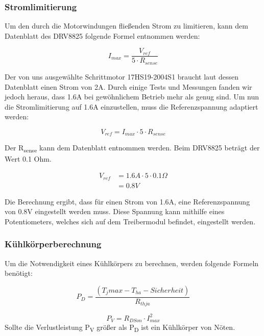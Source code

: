 \subsubsection{Stromlimitierung}
Um den durch die Motorwindungen fließenden Strom zu limitieren, kann dem Datenblatt des DRV8825 folgende Formel entnommen werden:

\begin{equation}
    I_{max} = \frac{V_{ref}} {5 \cdot R_{sense}}
\end{equation}

Der von uns ausgewählte Schrittmotor 17HS19-2004S1 braucht laut dessen Datenblatt einen Strom von 2A.
Durch einige Tests und Messungen fanden wir jedoch heraus, dass 1.6A bei gewöhnlichem Betrieb mehr als genug sind.
Um nun die Stromlimitierung auf 1.6A einzustellen, muss die Referenzspannung adaptiert werden:

\begin{equation*}
    V_{ref} = I_{max} \cdot 5 \cdot R_{sense}
\end{equation*}

Der R\textsubscript{sense} kann dem Datenblatt entnommen werden. Beim DRV8825 beträgt der Wert 0.1 Ohm.

\begin{align*}
    V_{ref} &= 1.6A \cdot 5 \cdot 0.1\Omega \\
    &= 0.8V
\end{align*}

Die Berechnung ergibt, dass für einen Strom von 1.6A, eine Referenzspannung von 0.8V eingestellt werden muss.
Diese Spannung kann mithilfe eines Potentiometers, welches sich auf dem Treibermodul befindet, eingestellt werden.

\subsubsection{Kühlkörperberechnung}
Um die Notwendigkeit eines Kühlkörpers zu berechnen, werden folgende Formeln benötigt:

\begin{equation}
    P_D = \frac{(T_jmax - T_{ha} - Sicherheit)}{R_{thja}}
\end{equation}

\begin{equation}
    P_V = R_{DSon} \cdot I_{max}^2
\end{equation}
Sollte die Verlustleistung P\textsubscript{V} größer als P\textsubscript{D} ist ein Kühlkörper von Nöten. \\

